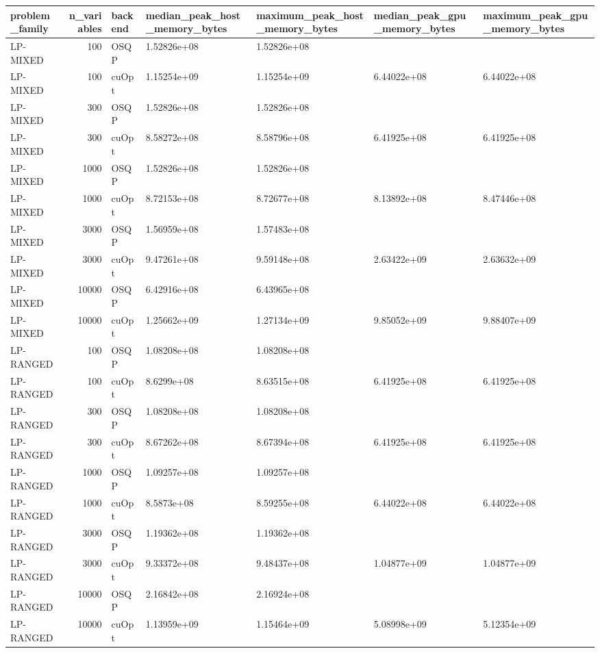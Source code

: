 \begin{table}
\label{tab:memory-usage}
\begin{tabular}{lrlllll}
\toprule
problem\_family & n\_variables & backend & median\_peak\_host\_memory\_bytes & maximum\_peak\_host\_memory\_bytes & median\_peak\_gpu\_memory\_bytes & maximum\_peak\_gpu\_memory\_bytes \\
\midrule
LP-MIXED & 100 & OSQP & 1.52826e+08 & 1.52826e+08 &  &  \\
LP-MIXED & 100 & cuOpt & 1.15254e+09 & 1.15254e+09 & 6.44022e+08 & 6.44022e+08 \\
LP-MIXED & 300 & OSQP & 1.52826e+08 & 1.52826e+08 &  &  \\
LP-MIXED & 300 & cuOpt & 8.58272e+08 & 8.58796e+08 & 6.41925e+08 & 6.41925e+08 \\
LP-MIXED & 1000 & OSQP & 1.52826e+08 & 1.52826e+08 &  &  \\
LP-MIXED & 1000 & cuOpt & 8.72153e+08 & 8.72677e+08 & 8.13892e+08 & 8.47446e+08 \\
LP-MIXED & 3000 & OSQP & 1.56959e+08 & 1.57483e+08 &  &  \\
LP-MIXED & 3000 & cuOpt & 9.47261e+08 & 9.59148e+08 & 2.63422e+09 & 2.63632e+09 \\
LP-MIXED & 10000 & OSQP & 6.42916e+08 & 6.43965e+08 &  &  \\
LP-MIXED & 10000 & cuOpt & 1.25662e+09 & 1.27134e+09 & 9.85052e+09 & 9.88407e+09 \\
LP-RANGED & 100 & OSQP & 1.08208e+08 & 1.08208e+08 &  &  \\
LP-RANGED & 100 & cuOpt & 8.6299e+08 & 8.63515e+08 & 6.41925e+08 & 6.41925e+08 \\
LP-RANGED & 300 & OSQP & 1.08208e+08 & 1.08208e+08 &  &  \\
LP-RANGED & 300 & cuOpt & 8.67262e+08 & 8.67394e+08 & 6.41925e+08 & 6.41925e+08 \\
LP-RANGED & 1000 & OSQP & 1.09257e+08 & 1.09257e+08 &  &  \\
LP-RANGED & 1000 & cuOpt & 8.5873e+08 & 8.59255e+08 & 6.44022e+08 & 6.44022e+08 \\
LP-RANGED & 3000 & OSQP & 1.19362e+08 & 1.19362e+08 &  &  \\
LP-RANGED & 3000 & cuOpt & 9.33372e+08 & 9.48437e+08 & 1.04877e+09 & 1.04877e+09 \\
LP-RANGED & 10000 & OSQP & 2.16842e+08 & 2.16924e+08 &  &  \\
LP-RANGED & 10000 & cuOpt & 1.13959e+09 & 1.15464e+09 & 5.08998e+09 & 5.12354e+09 \\

\end{tabular}
\end{table}
